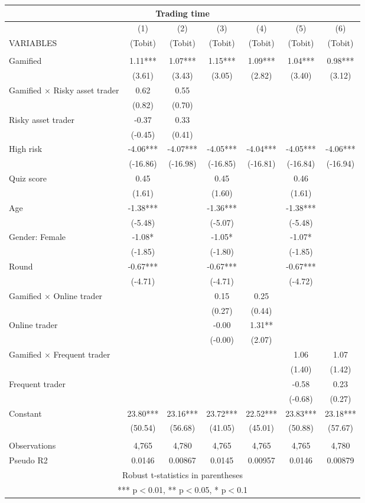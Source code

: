 \documentclass[]{article}
\begin{document}
\begin{tabular}{lcccccc}
\multicolumn{7}{c}{Trading time} \\ \hline
 & (1) & (2) & (3) & (4) & (5) & (6) \\
VARIABLES & (Tobit) & (Tobit) & (Tobit) & (Tobit) & (Tobit) & (Tobit) \\ \hline
 &  &  &  &  &  &  \\
Gamified & 1.11*** & 1.07*** & 1.15*** & 1.09*** & 1.04*** & 0.98*** \\
 & (3.61) & (3.43) & (3.05) & (2.82) & (3.40) & (3.12) \\
Gamified $\times$ Risky asset trader & 0.62 & 0.55 &  &  &  &  \\
 & (0.82) & (0.70) &  &  &  &  \\
Risky asset trader & -0.37 & 0.33 &  &  &  &  \\
 & (-0.45) & (0.41) &  &  &  &  \\
High risk & -4.06*** & -4.07*** & -4.05*** & -4.04*** & -4.05*** & -4.06*** \\
 & (-16.86) & (-16.98) & (-16.85) & (-16.81) & (-16.84) & (-16.94) \\
Quiz score & 0.45 &  & 0.45 &  & 0.46 &  \\
 & (1.61) &  & (1.60) &  & (1.61) &  \\
Age & -1.38*** &  & -1.36*** &  & -1.38*** &  \\
 & (-5.48) &  & (-5.07) &  & (-5.48) &  \\
Gender: Female & -1.08* &  & -1.05* &  & -1.07* &  \\
 & (-1.85) &  & (-1.80) &  & (-1.85) &  \\
Round & -0.67*** &  & -0.67*** &  & -0.67*** &  \\
 & (-4.71) &  & (-4.71) &  & (-4.72) &  \\
Gamified $\times$ Online trader &  &  & 0.15 & 0.25 &  &  \\
 &  &  & (0.27) & (0.44) &  &  \\
Online trader &  &  & -0.00 & 1.31** &  &  \\
 &  &  & (-0.00) & (2.07) &  &  \\
Gamified $\times$ Frequent trader &  &  &  &  & 1.06 & 1.07 \\
 &  &  &  &  & (1.40) & (1.42) \\
Frequent trader &  &  &  &  & -0.58 & 0.23 \\
 &  &  &  &  & (-0.68) & (0.27) \\
Constant & 23.80*** & 23.16*** & 23.72*** & 22.52*** & 23.83*** & 23.18*** \\
 & (50.54) & (56.68) & (41.05) & (45.01) & (50.88) & (57.67) \\
 &  &  &  &  &  &  \\
Observations & 4,765 & 4,780 & 4,765 & 4,765 & 4,765 & 4,780 \\
 Pseudo R2 & 0.0146 & 0.00867 & 0.0145 & 0.00957 & 0.0146 & 0.00879 \\ \hline
\multicolumn{7}{c}{ Robust t-statistics in parentheses} \\
\multicolumn{7}{c}{ *** p$<$0.01, ** p$<$0.05, * p$<$0.1} \\
\end{tabular}
\end{document}
